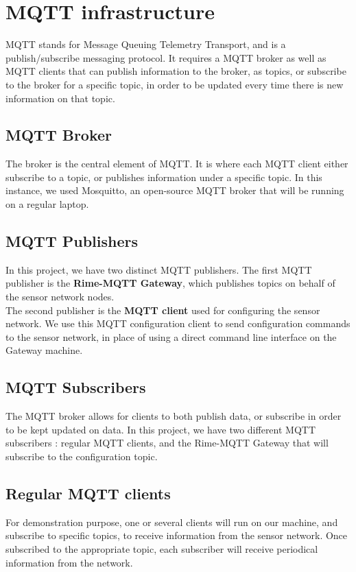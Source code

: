 \documentclass[a4paper,11pt]{article}
\begin{document}
\section{MQTT infrastructure}
MQTT stands for Message Queuing Telemetry Transport, and is a publish/subscribe messaging protocol. It requires a MQTT broker as well as MQTT clients that can publish information to the broker, as topics, or subscribe to the broker for a specific topic, in order to be updated every time there is new information on that topic.

\subsection{MQTT Broker}
The broker is the central element of MQTT. It is where each MQTT client either subscribe to a topic, or publishes information under a specific topic. In this instance, we used Mosquitto, an open-source MQTT broker that will be running on a regular laptop.


\subsection{MQTT Publishers}
In this project, we have two distinct MQTT publishers. The first MQTT publisher is the \textbf{Rime-MQTT Gateway}, which publishes topics on behalf of the sensor network nodes.\\

The second publisher is the \textbf{MQTT client} used for configuring the sensor network. We use this MQTT configuration client to send configuration commands to the sensor network, in place of using a direct command line interface on the Gateway machine.

\subsection{MQTT Subscribers}
The MQTT broker allows for clients to both publish data, or subscribe in order to be kept updated on data. In this project, we have two different MQTT subscribers : regular MQTT clients, and the Rime-MQTT Gateway that will subscribe to the configuration topic.

\subsection{Regular MQTT clients}
For demonstration purpose, one or several clients will run on our machine, and subscribe to specific topics, to receive information from the sensor network. Once subscribed to the appropriate topic, each subscriber will receive periodical information from the network.
\end{document}
